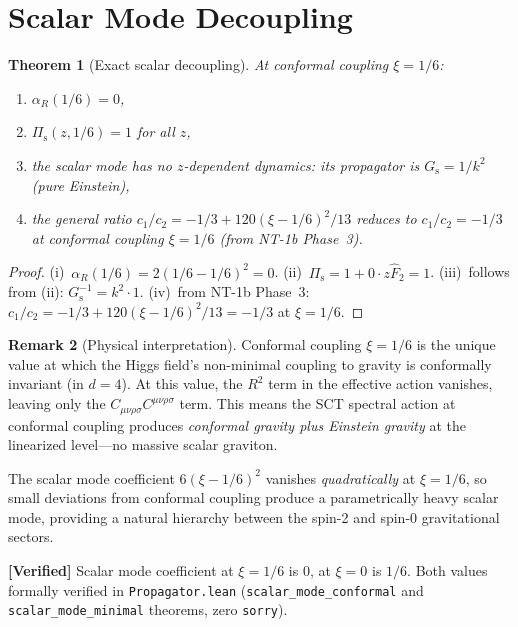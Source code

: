 \documentclass[11pt,a4paper]{article}
\newcommand{\Weylsq}{C_{\mu\nu\rho\sigma}C^{\mu\nu\rho\sigma}}
\theoremstyle{plain}
\newtheorem{theorem}{Theorem}[section]
\theoremstyle{definition}
\newtheorem{remark}[theorem]{Remark}
\newcommand{\verified}[1]{%
  \par\smallskip\noindent
  \colorbox{green!10}{\parbox{\dimexpr\linewidth-2\fboxsep}{%
    \textcolor{green!50!black}{\textbf{[Verified]}} #1}}%
  \par\smallskip}
\begin{document}
\section{Scalar Mode Decoupling}\label{sec:decoupling}

\begin{theorem}[Exact scalar decoupling]\label{thm:decoupling}
At conformal coupling $\xi = 1/6$:
\begin{enumerate}[nosep,label=(\roman*)]
  \item $\alpha_R(1/6) = 0$,
  \item $\Pi_{\mathrm{s}}(z, 1/6) = 1$ for all $z$,
  \item the scalar mode has no $z$-dependent dynamics:
    its propagator is $G_{\mathrm{s}} = 1/k^2$ (pure Einstein),
  \item the general ratio $c_1/c_2 = -1/3 + 120(\xi-1/6)^2/13$ reduces to
    $c_1/c_2 = -1/3$ at conformal coupling $\xi = 1/6$ (from NT-1b Phase~3).
\end{enumerate}
\end{theorem}

\begin{proof}
(i)~$\alpha_R(1/6) = 2(1/6 - 1/6)^2 = 0$.
(ii)~$\Pi_{\mathrm{s}} = 1 + 0 \cdot z\hat{F}_2 = 1$.
(iii)~follows from (ii): $G_{\mathrm{s}}^{-1} = k^2 \cdot 1$.
(iv)~from NT-1b Phase~3: $c_1/c_2 = -1/3 + 120(\xi-1/6)^2/13
= -1/3$ at $\xi = 1/6$.
\end{proof}

\begin{remark}[Physical interpretation]
Conformal coupling $\xi = 1/6$ is the unique value at which the
Higgs field's non-minimal coupling to gravity is conformally
invariant (in $d = 4$). At this value, the $R^2$ term in the
effective action vanishes, leaving only the $\Weylsq$ term.
This means the SCT spectral action at conformal coupling produces
\emph{conformal gravity plus Einstein gravity} at the linearized
level---no massive scalar graviton.

The scalar mode coefficient $6(\xi-1/6)^2$ vanishes \emph{quadratically}
at $\xi = 1/6$, so small deviations from conformal coupling produce
a parametrically heavy scalar mode, providing a natural hierarchy
between the spin-2 and spin-0 gravitational sectors.
\end{remark}

\verified{Scalar mode coefficient at $\xi = 1/6$ is 0, at $\xi = 0$
is $1/6$. Both values formally verified in \texttt{Propagator.lean}
(\texttt{scalar\_mode\_conformal} and \texttt{scalar\_mode\_minimal}
theorems, zero \texttt{sorry}).}
\end{document}
